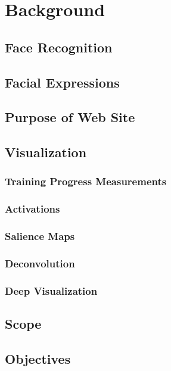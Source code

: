 \newpage
\chapter{Background}

\section{Face Recognition}

\section{Facial Expressions}

\section{Purpose of Web Site}

\section{Visualization}

\subsection{Training Progress Measurements}

\subsection{Activations}

\subsection{Salience Maps}

\subsection{Deconvolution}

\subsection{Deep Visualization}

\section{Scope}

\section{Objectives}
